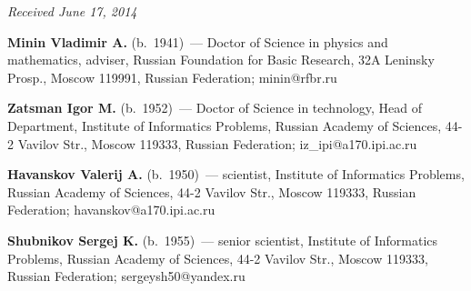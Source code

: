 \vspace*{-6pt}

\hfill{\small\textit{Received June 17, 2014}}

\vspace*{-18pt}

\Contr

\noindent
\textbf{Minin Vladimir A.} (b.\ 1941)~---
Doctor of Science in physics and mathematics, adviser,
Russian Foundation for Basic Research,  32A Leninsky Prosp., Moscow 119991,
Russian Federation; minin@rfbr.ru

\vspace*{3pt}

\noindent
\textbf{Zatsman Igor M.} (b.\ 1952)~---
Doctor of Science in technology, Head of Department, Institute of Informatics Problems,
Russian Academy of Sciences, 44-2 Vavilov Str., Moscow 119333, Russian
Federation; iz\_ipi@a170.ipi.ac.ru

\vspace*{3pt}

\noindent
\textbf{Havanskov Valerij A.} (b.\ 1950)~---
scientist, Institute of Informatics Problems,
Russian Academy of Sciences, 44-2 Vavilov Str., Moscow 119333, Russian
Federation; havanskov@a170.ipi.ac.ru

\vspace*{3pt}

\noindent
\textbf{Shubnikov Sergej K.} (b.\ 1955)~---
senior scientist, Institute of Informatics Problems, Russian Academy of Sciences,
44-2 Vavilov Str., Moscow 119333, Russian Federation;
 sergeysh50@yandex.ru




 \label{end\stat}

\renewcommand{\bibname}{\protect\rm Литература}